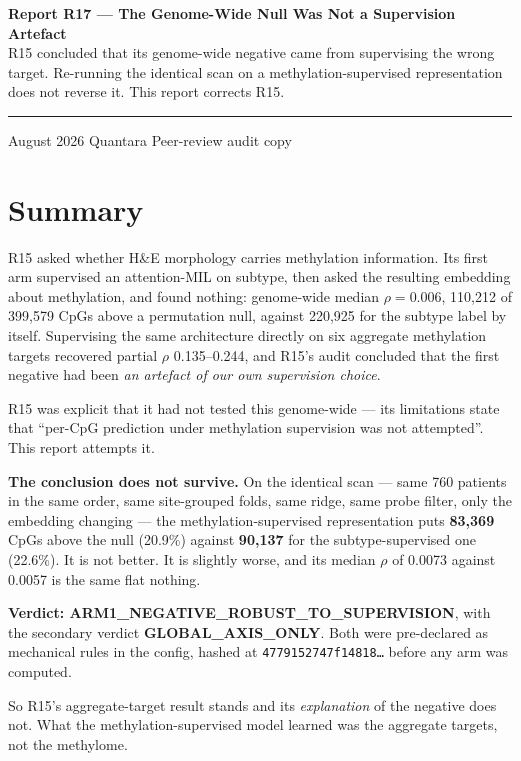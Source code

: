 \documentclass[11pt,a4paper]{article}
\begin{document}
\thispagestyle{empty}
\noindent
{\large\bfseries\color{qnavy} Report R17 --- The Genome-Wide Null Was Not a Supervision Artefact}\\[2pt]
{\color{qgrey}R15 concluded that its genome-wide negative came from supervising the wrong target.
Re-running the identical scan on a methylation-supervised representation does not reverse it.
This report corrects R15.}\\[6pt]
{\color{qgrey}\rule{\textwidth}{0.4pt}}

\medskip
{} August 2026 \quad\textbullet\quad Quantara \quad\textbullet\quad
{\color{qgrey}Peer-review audit copy}

\section*{Summary}

R15 asked whether H\&E morphology carries methylation information. Its first arm supervised an
attention-MIL on subtype, then asked the resulting embedding about methylation, and found nothing:
genome-wide median $\rho = 0.006$, 110{,}212 of 399{,}579 CpGs above a permutation null, against
220{,}925 for the subtype label by itself. Supervising the same architecture directly on six
aggregate methylation targets recovered partial $\rho$ 0.135--0.244, and R15's audit concluded
that the first negative had been \emph{an artefact of our own supervision choice}.

R15 was explicit that it had not tested this genome-wide --- its limitations state that
``per-CpG prediction under methylation supervision was not attempted''. This report attempts it.

\textbf{The conclusion does not survive.} On the identical scan --- same 760 patients in the same
order, same site-grouped folds, same ridge, same probe filter, only the embedding changing --- the
methylation-supervised representation puts \textbf{83{,}369} CpGs above the null (20.9\%) against
\textbf{90{,}137} for the subtype-supervised one (22.6\%). It is not better. It is slightly worse,
and its median $\rho$ of 0.0073 against 0.0057 is the same flat nothing.

\textbf{Verdict: ARM1\_NEGATIVE\_ROBUST\_TO\_SUPERVISION}, with the secondary verdict
\textbf{GLOBAL\_AXIS\_ONLY}. Both were pre-declared as mechanical rules in the config, hashed at
\texttt{4779152747f14818\ldots} before any arm was computed.

So R15's aggregate-target result stands and its \emph{explanation} of the negative does not. What
the methylation-supervised model learned was the aggregate targets, not the methylome.
\end{document}
